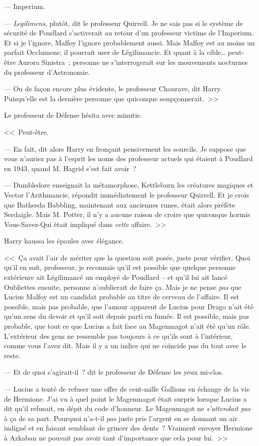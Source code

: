 --- Imperium.

--- \emph{Legilimens}, plutôt, dit le professeur Quirrell. Je ne sais pas si le système de sécurité de Poudlard s'activerait au retour d'un professeur victime de l'Imperium. Et si je l'ignore, Malfoy l'ignore probablement aussi. Mais Malfoy est au moins un parfait Occlumens; il pourrait user de Légilimancie. Et quant à la cible… peut-être Aurora Sinistra~; personne ne s'interrogerait sur les mouvements nocturnes du professeur d'Astronomie.

--- Ou de façon encore plus évidente, le professeur Chourave, dit Harry. Puisqu'elle est la dernière personne que quiconque soupçonnerait.~>>

Le professeur de Défense hésita avec minutie.

<<~Peut-être.

--- En fait, dit alors Harry en fronçant pensivement les sourcils. Je suppose que vous n'auriez pas à l'esprit les noms des professeur actuels qui étaient à Poudlard en 1943, quand M. Hagrid s'est fait avoir~?

--- Dumbledore enseignait la métamorphose, Kettleburn les créatures magiques et Vector l'Arithmancie, répondit immédiatement le professeur Quirrell. Et je crois que Bathesda Babbling, maintenant aux anciennes runes, était alors préfète Serdaigle. Mais M. Potter, il n'y a aucune raison de croire que quiconque hormis Vous-Savez-Qui était impliqué dans \emph{cette} affaire.~>>

Harry haussa les épaules avec élégance.

<<~Ça avait l'air de mériter que la question soit posée, juste pour vérifier. Quoi qu'il en soit, professeur, je reconnais qu'il est possible que quelque personne extérieure ait Légilimancé un employé de Poudlard -- et qu'il lui ait lancé Oubliettes ensuite, personne n'oublierait de faire ça. Mais je ne pense \emph{pas} que Lucius Malfoy est un candidat probable au titre de cerveau de l'affaire. Il est possible, mais pas probable, que l'amour apparent de Lucius pour Drago n'ait été qu'un sens du devoir et qu'il soit depuis parti en fumée. Il est possible, mais pas probable, que tout ce que Lucius a fait face au Magenmagot n'ait été qu'un rôle. L'extérieur des gens ne ressemble pas toujours à ce qu'ils sont à l'intérieur, comme vous l'avez dit. Mais il y a un indice qui ne coïncide pas du tout avec le reste.

--- Et de quoi s'agirait-il~? dit le professeur de Défense les yeux mi-clos.

--- Lucius a tenté de refuser une offre de cent-mille Gallions en échange de la vie de Hermione. J'ai vu à quel point le Magenmagot était surpris lorsque Lucius a dit qu'il refusait, en dépit du code d'honneur. Le Magenmagot ne \emph{s'attendait pas} à ça de sa part. Pourquoi n'a-t-il \emph{pas} juste pris l'argent en se donnant un air indigné et en faisant semblant de grincer des dents~? Vraiment envoyer Hermione à Azkaban ne pouvait pas avoir tant d'importance que cela pour lui.~>>

